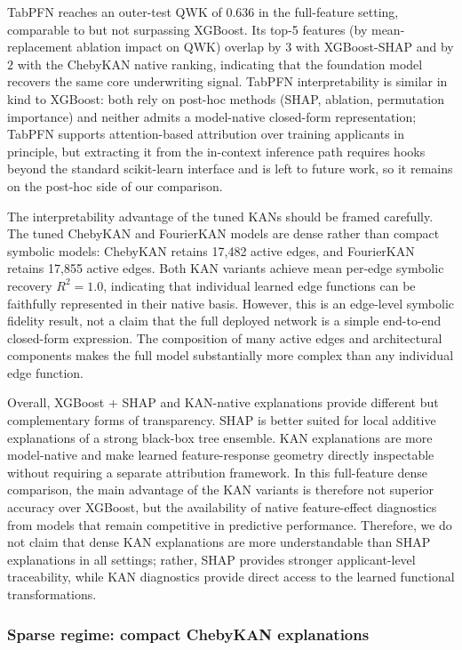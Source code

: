 \documentclass{article}
\begin{document}
TabPFN reaches an outer-test QWK of $0.636$ in the full-feature setting, comparable to but not surpassing XGBoost. Its top-5 features (by mean-replacement ablation impact on QWK) overlap by $3$ with XGBoost-SHAP and by $2$ with the ChebyKAN native ranking, indicating that the foundation model recovers the same core underwriting signal. TabPFN interpretability is similar in kind to XGBoost: both rely on post-hoc methods (SHAP, ablation, permutation importance) and neither admits a model-native closed-form representation; TabPFN supports attention-based attribution over training applicants in principle, but extracting it from the in-context inference path requires hooks beyond the standard scikit-learn interface and is left to future work, so it remains on the post-hoc side of our comparison.

The interpretability advantage of the tuned KANs should be framed carefully. The tuned ChebyKAN and FourierKAN models are dense rather than compact symbolic models: ChebyKAN retains 17{,}482 active edges, and FourierKAN retains 17{,}855 active edges. Both KAN variants achieve mean per-edge symbolic recovery $R^2=1.0$, indicating that individual learned edge functions can be faithfully represented in their native basis. However, this is an edge-level symbolic fidelity result, not a claim that the full deployed network is a simple end-to-end closed-form expression. The composition of many active edges and architectural components makes the full model substantially more complex than any individual edge function.

Overall, XGBoost + SHAP and KAN-native explanations provide different but complementary forms of transparency. SHAP is better suited for local additive explanations of a strong black-box tree ensemble. KAN explanations are more model-native and make learned feature-response geometry directly inspectable without requiring a separate attribution framework. In this full-feature dense comparison, the main advantage of the KAN variants is therefore not superior accuracy over XGBoost, but the availability of native feature-effect diagnostics from models that remain competitive in predictive performance. Therefore, we do not claim that dense KAN explanations are more understandable than SHAP explanations in all settings; rather, SHAP provides stronger applicant-level traceability, while KAN diagnostics provide direct access to the learned functional transformations.

\subsubsection{Sparse regime: compact ChebyKAN explanations}
\label{sec:interpretability_sparse}
\end{document}
